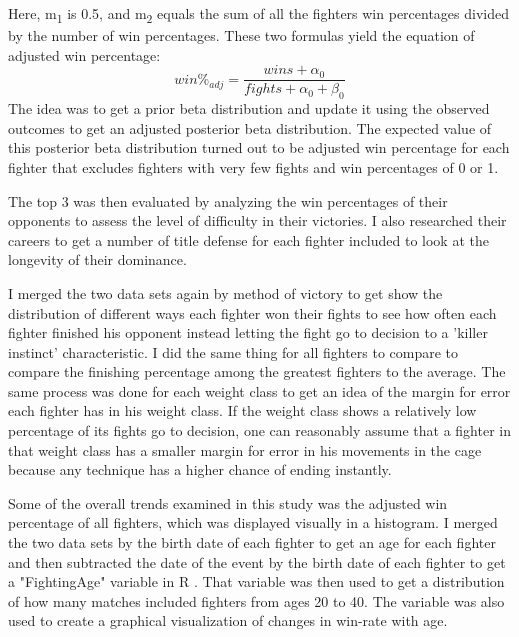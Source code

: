 \documentclass[12pt,english]{report}
\begin{document}
Here, m\textsubscript{1} is 0.5, and m\textsubscript{2} equals the sum of all the fighters win percentages divided by the number of win percentages. These two formulas yield the equation of adjusted win percentage:
\begin{equation}
win\%_{adj} = \frac{wins + \alpha_{0}}{fights + \alpha_{0} + \beta_{0}}
\end{equation}
The idea was to get a prior beta distribution and update it using the observed outcomes to get an adjusted posterior beta distribution. The expected value of this posterior beta distribution turned out to be adjusted win percentage for each fighter that excludes fighters with very few fights and win percentages of 0 or 1. \cite{Lahrichi_ka2016} \par The top 3 was then evaluated by analyzing the win percentages of their opponents to assess the level of difficulty in their victories. I also researched their careers to get a number of title defense for each fighter included to look at the longevity of their dominance. \par I merged the two data sets again by method of victory to get show the distribution of different ways each fighter won their fights to see how often each fighter finished his opponent instead letting the fight go to decision to a 'killer instinct' characteristic. I did the same thing for all fighters to compare to compare the finishing percentage among the greatest fighters to the average. The same process was done for each weight class to get an idea of the margin for error each fighter has in his weight class. If the weight class shows a relatively low percentage of its fights go to decision, one can reasonably assume that a fighter in that weight class has a smaller margin for error in his movements in the cage because any technique has a higher chance of ending instantly. \par Some of the overall trends examined in this study was the adjusted win percentage of all fighters, which was displayed visually in a histogram. I merged the two data sets by the birth date of each fighter to get an age for each fighter and then subtracted the date of the event by the birth date of each fighter to get a "FightingAge" variable in R \cite{qiao_ji2017}. That variable was then used to get a distribution of how many matches included fighters from ages 20 to 40. The variable was also used to create a graphical visualization of changes in win-rate with age. 
\end{document}
